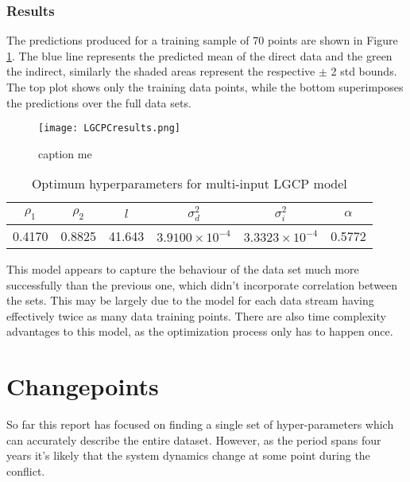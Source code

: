 \documentclass[a4paper,11pt]{report}
\begin{document}
\subsection{Results}
The predictions produced for a training sample of 70 points are shown in Figure \ref{fig:LGCPCresults}. The blue line represents the predicted mean of the direct data and the green the indirect, similarly the shaded areas represent the respective \(\pm\) 2 std bounds. The top plot shows only the training data points, while the bottom superimposes the predictions over the full data sets. \par

\begin{figure}
\centering
\texttt{[image: LGCPCresults.png]}
\caption{caption me}
\label{fig:LGCPCresults}
\end{figure}

\begin{table}[]
\centering
\caption{Optimum hyperparameters for multi-input LGCP model}
\label{LGCPChyper}
\begin{tabular}{|c|c|c|c|c|c|}
\hline
\multicolumn{1}{|c|}{\(\rho_1\)} & \multicolumn{1}{c|}{\(\rho_2\)} & \(l\)                      & \(\sigma_d^2\)            & \(\sigma_i^2\)            & \(\alpha\) \\ \hline
0.4170                            & 0.8825                           & \multicolumn{1}{c|}{41.643} & \(3.9100 \times 10^{-4}\) & \(3.3323 \times 10^{-4}\) & 0.5772     \\ \hline
\end{tabular}
\end{table}

This model appears to capture the behaviour of the data set much more successfully than the previous one, which didn't incorporate correlation between the sets. This may be largely due to the model for each data stream having effectively twice as many data training points. There are also time complexity advantages to this model, as the optimization process only has to happen once.


\chapter{Changepoints}

So far this report has focused on finding a single set of hyper-parameters which can accurately describe the entire dataset. However, as the period spans four years it's likely that the system dynamics change at some point during the conflict.
\end{document}
